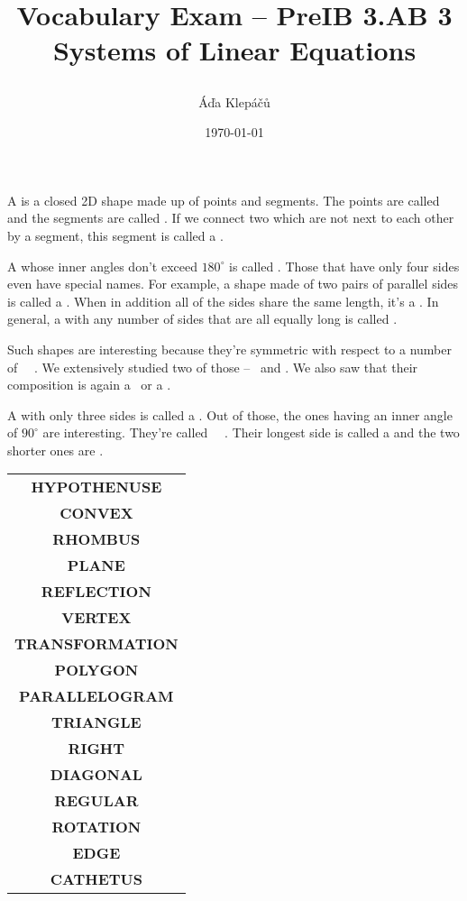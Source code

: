 \documentclass[a4paper,11pt]{article}
\title{\Huge\textsf{Vocabulary Exam -- PreIB 3.AB 3}\\
 \Large\textsf{Systems of Linear Equations}
 \author{Áďa Klepáčů}
 \date{\today}
}
\newcommand{\blank}{\underline{\hspace{16ex}}}
\begin{document}
\thispagestyle{fancy}

\begin{paracol}{2}
 A \blank is a closed 2D shape made up of points and segments. The points are
 called \blank and the segments are called \blank. If we connect two \blank
 which are not next to each other by a segment, this segment is called a \blank.

 A \blank whose inner angles don't exceed $180^{ \circ }$ is called \blank.
 Those that have only four sides even have special names. For example, a shape
 made of two pairs of parallel sides is called a \blank. When in addition all of
 the sides share the same length, it's a \blank. In general, a \blank with any
 number of sides that are all equally long is called \blank.

 Such shapes are interesting because they're symmetric with respect to a number
 of \blank~~\blank. We extensively studied two of those -- \blank~and \blank. We
 also saw that their composition is again a \blank~or a \blank.

 A \blank with only three sides is called a \blank. Out of those, the ones
 having an inner angle of $90^{ \circ }$ are interesting. They're called
 \blank~~\blank. Their longest side is called a \blank and the two shorter ones
 are \blank.

 \switchcolumn
 \renewcommand{\arraystretch}{2}
 \begin{tabular}{c}
  \textbf{HYPOTHENUSE}\\
  \textbf{CONVEX}\\
  \textbf{RHOMBUS}\\
  \textbf{PLANE}\\
  \textbf{REFLECTION}\\
  \textbf{VERTEX}\\
  \textbf{TRANSFORMATION}\\
  \textbf{POLYGON}\\
  \textbf{PARALLELOGRAM}\\
  \textbf{TRIANGLE}\\
  \textbf{RIGHT}\\
  \textbf{DIAGONAL}\\
  \textbf{REGULAR}\\
  \textbf{ROTATION}\\
  \textbf{EDGE}\\
  \textbf{CATHETUS}
 \end{tabular}
\end{paracol}
\end{document}
